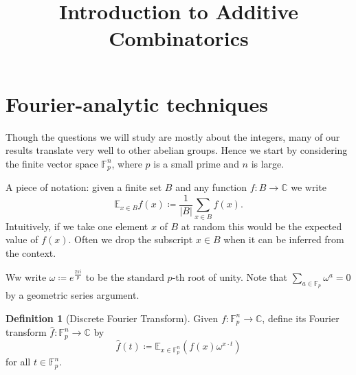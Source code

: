 \documentclass{report}
\theoremstyle{definition}
\theoremstyle{plain}
\theoremstyle{definition}
\newtheorem{defn}[thm]{Definition}
\begin{document}
	\title{Introduction to Additive Combinatorics}
	\maketitle
	\section{Fourier-analytic techniques}
	Though the questions we will study are mostly about the integers, many of our results translate very well to other abelian groups. Hence we start by considering the finite vector space $\mathbb{F}_p^n$, where $p$ is a small prime and $n$ is large.
	
	A piece of notation: given a finite set $B$ and any function $f\colon B \to \mathbb{C}$ we write
	\[
		\mathbb{E}_{x\in B} f(x) \coloneqq \frac{1}{|B|}\sum_{x\in B}f(x).
	\]
	Intuitively, if we take one element $x$ of $B$ at random this would be the expected value of $f(x)$. Often we drop the subscript $x\in B$ when it can be inferred from the context.
	
	Ww write $\omega \coloneqq e^{\frac{2\pi i}{p}}$ to be the standard $p$-th root of unity. Note that $\sum_{a\in \mathbb{F}_p} \omega^a = 0$ by a geometric series argument.
	
	\begin{defn}[Discrete Fourier Transform]
		Given $f\colon \mathbb{F}_p^n\to \mathbb{C}$, define its Fourier transform $\hat{f}\colon \mathbb{F}^n_p\to \mathbb{C}$ by 
		\[
			\hat{f}(t)\coloneqq \mathbb{E}_{x\in \mathbb{F}^n_p}(f(x)\omega^{x\cdot t})
		\]
		for all $t\in \mathbb{F}_p^n$.
	\end{defn}
	
\end{document}
